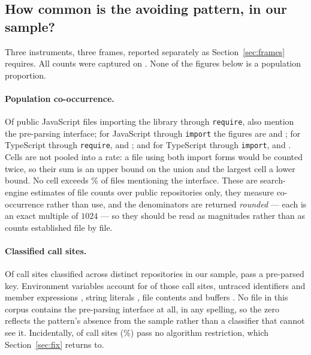 \documentclass[pdflatex,sn-basic,twocolumn]{sn-jnl}%
\begin{document}
\subsection{How common is the avoiding pattern, in our
sample?}\label{sec:prevalence}

Three instruments, three frames, reported separately as Section~\ref{sec:frames}
requires. All counts were captured on \PopCapturedAt. None of the figures below
is a population proportion.

\paragraph{Population co-occurrence.} Of \PopJsRequireFiles{} public JavaScript
files importing the library through \texttt{require},
\PopJsRequireFilesWithApi{} also mention the pre-parsing interface; for
JavaScript through \texttt{import} the figures are \PopJsImportFiles{} and
\PopJsImportFilesWithApi; for TypeScript through \texttt{require},
\PopTsRequireFiles{} and \PopTsRequireFilesWithApi; and for TypeScript through
\texttt{import}, \PopTsImportFiles{} and \PopTsImportFilesWithApi. Cells are not
pooled into a rate: a file using both import forms would be counted twice, so
their sum \PopSumFiles{} is an upper bound on the union and the largest cell
\PopLargestCellFiles{} a lower bound. No cell exceeds \PopWorstCellPct\% of files
mentioning the interface. These are search-engine estimates of file counts over
public repositories only, they measure co-occurrence rather than use, and the
denominators are returned \emph{rounded} --- each is an exact multiple of $1024$
--- so they should be read as magnitudes rather than as counts established file
by file.

\paragraph{Classified call sites.} Of \SampleCallSites{} call sites classified
across \SampleRepos{} distinct repositories in our sample,
\SampleSitesPreparsed{} pass a pre-parsed key. Environment variables account for
\SampleEnvString{} of those call sites, untraced identifiers and member
expressions \SampleUnknown{}, string literals \SampleStringLiteral{}, file
contents \SampleFileContents{} and buffers \SampleBuffer. No file in this corpus
contains the pre-parsing interface at all, in any spelling, so the zero reflects
the pattern's absence from the sample rather than a classifier that cannot see
it. Incidentally, \SampleNoAlgorithms{} of \SampleCallSites{} call sites
(\SampleNoAlgorithmsPct\%) pass no algorithm restriction, which
Section~\ref{sec:fix} returns to.
\end{document}
